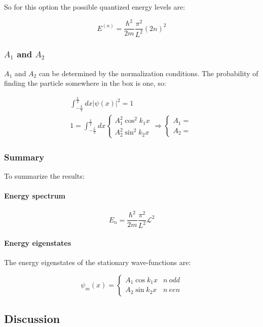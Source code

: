     So for this option the possible quantized energy levels are:

    $$E^{(n)} = \frac{\hbar^2}{2m}\frac{\pi^2}{L^2}(2n)^2$$

    \subsubsection{$A_1$ and $A_2$}
    $A_1$ and $A_2$ can be determined by the normalization conditions.
    The probability of finding the particle somewhere in the box is one, so:

    \begin{align*}
      \int_{-\frac{L}{2}}^{\frac{L}{2}} dx|\psi(x)|^2 = 1\\
      1 = \int_{-\frac{L}{2}}^{\frac{L}{2}} dx\begin{cases}A_1^2\cos^2k_1x\\A_2^2\sin^2 k_2x\end{cases}\Rightarrow\begin{cases}A_1 = \\A_2 = \end{cases}
    \end{align*}

    \subsubsection{Summary}
    To summarize the results:

      \paragraph{Energy spectrum}

      $$E_n = \frac{\hbar^2}{2m}\frac{\pi^2}{L^2}\mathcal{L}^2$$

      \paragraph{Energy eigenstates}
      The energy eigenstates of the stationary wave-functions are:

      $$\psi_m(x) = \begin{cases}A_1\cos k_1 x & n\ odd\\ A_2\sin k_2 x & n\ een\end{cases}$$


  \subsection{Discussion}

